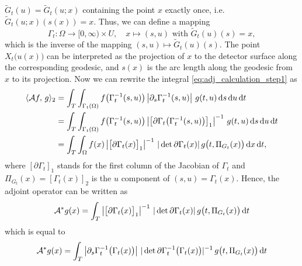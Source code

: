 \documentclass{amsart}
\begin{document}
$\tilde G_t(u) = \tilde G_t(u; x)$ containing the point $x$ exactly once, i.e. $\tilde G_t(u; x)(s(x)) = x$. Thus, we can define a 
mapping
%
\begin{equation*}
 \Gamma_t: \Omega \to [0, \infty) \times U,\quad x \mapsto (s, u) \text{ with } \tilde G_t(u)(s) = x,
\end{equation*}
%
which is the inverse of the mapping $(s,u) \mapsto \tilde G_t(u)(s)$. The point $X_t\big(u(x)\big)$ can be interpreted as the projection of 
$x$ to the detector surface along the corresponding geodesic, and $s(x)$ is the arc length along the geodesic from $x$ to its projection. 
Now we can rewrite the integral \eqref{eq:adj_calculation_step1} as
%
\begin{align*}
 \langle {\ensuremath{\mathcal{A}}} f,\,g\rangle_2
 &= \int_T \int_{\Gamma_t(\Omega)} f\big(\Gamma_t^{-1}(s,u)\big) \left| \partial_s \Gamma_t^{-1}(s,u) \right|\, g(t, u)\, \mathrm{d} s\, \mathrm{d} u\, 
 \mathrm{d} t  \\
 &= \int_T \int_{\Gamma_t(\Omega)} f\big(\Gamma_t^{-1}(s,u)\big) \left| \big[\partial \Gamma_t\big(\Gamma_t^{-1}(s,u)\big)\big]_1 \right|^{-1}\, 
 g(t, u)\, \mathrm{d}  s\, \mathrm{d} u\, \mathrm{d} t \\
 &= \int_T \int_\Omega f(x) \left| \big[\partial \Gamma_t(x)\big]_1 \right|^{-1}\, |\operatorname*{det}{\partial \Gamma_t(x)}|\, 
 g\big(t, \Pi_{G_t}(x)\big)
 \, \mathrm{d} x\, \mathrm{d} t,
\end{align*}
%
where $[\partial \Gamma_t]_1$ stands for the first column of the Jacobian of $\Gamma_t$ and $\Pi_{G_t}(x) = [\Gamma_t(x)]_2$ is the $u$ 
component of $(s, u) = \Gamma_t(x)$. Hence, the adjoint operator can be written as
%
\begin{equation}
 \label{eq:adj_op_onedir}
 {\ensuremath{{\mathcal{A}}^*}} g(x) = \int_T \left| \big[\partial \Gamma_t(x)\big]_1 \right|^{-1}\, |\operatorname*{det}{\partial \Gamma_t(x)}|\, g\big(t, \Pi_{G_t}(x)\big)\, 
 \mathrm{d} t
\end{equation}
%
which is equal to
%
\begin{equation}
 \label{eq:adj_op_onedir_alt}
 {\ensuremath{{\mathcal{A}}^*}} g(x) = \int_T \left| \partial_s \Gamma_t^{-1}\big(\Gamma_t(x)\big) \right|\, 
 |\operatorname*{det}{\partial \Gamma_t^{-1}\big(\Gamma_t(x)\big)}|^{-1}\, g\big(t, \Pi_{G_t}(x)\big)\, \mathrm{d} t
\end{equation}
%
%
\end{document}

